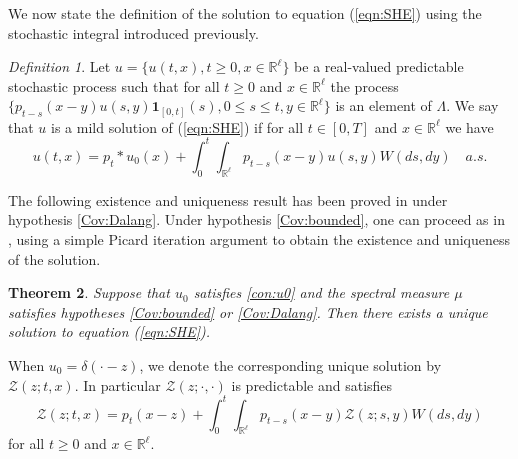 \documentclass[12pt,reqno]{amsart}
\newtheorem{theorem}{Theorem}[section]
\theoremstyle{remark}
\newtheorem{definition}[theorem]{Definition}
\newcommand{\1}{\mathbf{1}}
\def\RR{\mathbb{R}}
\def\Z{\mathcal{Z}}
\begin{document}
	
		We now state the definition of the solution to equation  (\ref{eqn:SHE}) using the stochastic integral introduced previously.
		\begin{definition}\label{def-sol-sigma}
			Let $u=\{u(t,x),  t\ge 0, x \in \mathbb{R}^\ell\}$ be a real-valued predictable stochastic process  such that for all $t \ge 0$ and $x\in\RR^\ell$ the process $\{p_{t-s}(x-y)u(s,y) \mathbf{1}_{[0,t]}(s), 0 \leq s \leq t, y \in \mathbb{R}^\ell\}$ is an element of $\Lambda$.
			We say that $u$ is a mild solution of  (\ref{eqn:SHE}) if for all $t \in [0,T]$ and $x\in \mathbb{R}^\ell$ we have
			\begin{equation}\label{eq:mild-formulation sigma}
				u(t,x)=p_t*u_0 (x) + \int_0^t \int_{\mathbb{R}^\ell}p_{t-s}(x-y)u(s,y) W(ds,dy) \quad a.s.
			\end{equation}
		\end{definition}
		The following existence and uniqueness result has been proved in \cite{HLN15}{ under hypothesis \ref{Cov:Dalang}. Under hypothesis \ref{Cov:bounded}, one can proceed as in \cite{Huang}, using a simple Picard iteration argument to obtain the existence and uniqueness of the solution.}
		\begin{theorem}  \label{thm1}
		Suppose that $u_0$ satisfies \eqref{con:u0} and the spectral  measure $\mu$ satisfies  hypotheses \ref{Cov:bounded} or \ref{Cov:Dalang}.    Then there exists a unique solution to equation (\ref{eqn:SHE}).
		\end{theorem}
	When $u_0=\delta(\cdot-z)$, we denote the corresponding unique solution by $\Z(z; t, x)$. 
	In particular $\Z(z;\cdot,\cdot) $ is predictable and satisfies
	\begin{equation}\label{eqn:Z}
		\Z (z;t,x)=p_t(x-z)+\int_0^t\int_{\RR^\ell} p_{t-s}(x-y)\Z(z;s,y)W(ds,dy)
	 \end{equation}
	for all $t\ge0$ and $x\in\RR^\ell$. 	
\end{document}
